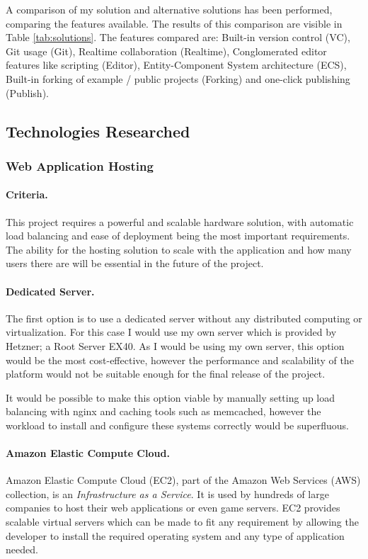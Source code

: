 \documentclass[a4paper, 12pt]{article}
\begin{document}
A comparison of my solution and alternative solutions has been performed, comparing the features available. The results of this comparison are visible in Table \ref{tab:solutions}. The features compared are: Built-in version control (VC), Git usage (Git), Realtime collaboration (Realtime), Conglomerated editor features like scripting (Editor), Entity-Component System architecture (ECS), Built-in forking of example / public projects (Forking) and one-click publishing (Publish).



\subsection{Technologies Researched}
\subsubsection{Web Application Hosting}
\paragraph{Criteria.}
This project requires a powerful and scalable hardware solution, with automatic load balancing and ease of deployment being the most important requirements. The ability for the hosting solution to scale with the application and how many users there are will be essential in the future of the project.

\paragraph{Dedicated Server.}
The first option is to use a dedicated server without any distributed computing or virtualization. For this case I would use my own server which is provided by Hetzner; a Root Server EX40. As I would be using my own server, this option would be the most cost-effective, however the performance and scalability of the platform would not be suitable enough for the final release of the project.

It would be possible to make this option viable by manually setting up load balancing with nginx and caching tools such as memcached, however the workload to install and configure these systems correctly would be superfluous.\cite{nginxloadbalancing,memcached}

\paragraph{Amazon Elastic Compute Cloud.}
Amazon Elastic Compute Cloud (EC2), part of the Amazon Web Services (AWS) collection, is an \emph{Infrastructure as a Service}.\cite{awsec2} It is used by hundreds of large companies to host their web applications or even game servers. EC2 provides scalable virtual servers which can be made to fit any requirement by allowing the developer to install the required operating system and any type of application needed.
\end{document}
